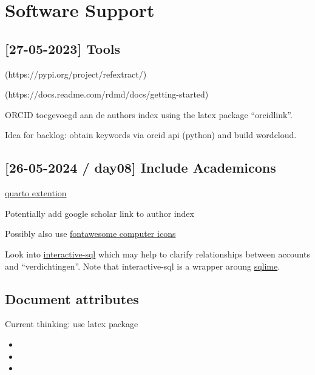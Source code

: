 \documentclass[
  letterpaper,
  DIV=11,
  numbers=noendperiod]{scrreprt}
\begin{document}
\hypertarget{software-support}{%
\chapter{Software Support}\label{software-support}}

\hypertarget{tools}{%
\section{{[}27-05-2023{]} Tools}\label{tools}}

(https://pypi.org/project/refextract/)

(https://docs.readme.com/rdmd/docs/getting-started)

ORCID toegevoegd aan de authors index using the latex package
``orcidlink''.

Idea for backlog: obtain keywords via orcid api (python) and build
wordcloud.

\hypertarget{day08-include-academicons}{%
\section{{[}26-05-2024 / day08{]} Include
Academicons}\label{day08-include-academicons}}

\href{https://schochastics.quarto.pub/academicons-quarto-extension/}{quarto
extention}

Potentially add google scholar link to author index

Possibly also use
\href{https://www.w3schools.com/icons/fontawesome5_icons_computers.asp}{fontawesome
computer icons}

Look into
\href{https://shafayetshafee.github.io/interactive-sql/example.html}{interactive-sql}
which may help to clarify relationships between accounts and
``verdichtingen''. Note that interactive-sql is a wrapper aroung
\href{https://sqlime.org/about.html}{sqlime}.

\hypertarget{document-attributes}{%
\section{Document attributes}\label{document-attributes}}

Current thinking: use latex package

\begin{itemize}
\item
  \totcounter
\item
\item
\end{itemize}
\end{document}
